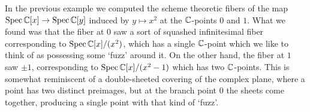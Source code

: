 In the previous example we computed the scheme theoretic fibers of the map $\operatorname{Spec} \mathbb{C}[x]\to \operatorname{Spec} \mathbb{C}[y]$ induced by $y\mapsto x^2$ at the $\mathbb{C}$-points $0$ and $1$. What we found was that the fiber at $0$ saw a sort of squashed infinitesimal fiber corresponding to $\operatorname{Spec}\mathbb{C}[x]/(x^2)$, which has a single $\mathbb{C}$-point which we like to think of as possessing some `fuzz' around it. On the other hand, the fiber at $1$ saw $\pm1$, corresponding to $\operatorname{Spec}\mathbb{C}[x]/(x^2-1)$ which has two $\mathbb{C}$-points. This is somewhat reminiscent of a double-sheeted covering of the complex plane, where a point has two distinct preimages, but at the branch point $0$ the sheets come together, producing a single point with that kind of `fuzz'.
